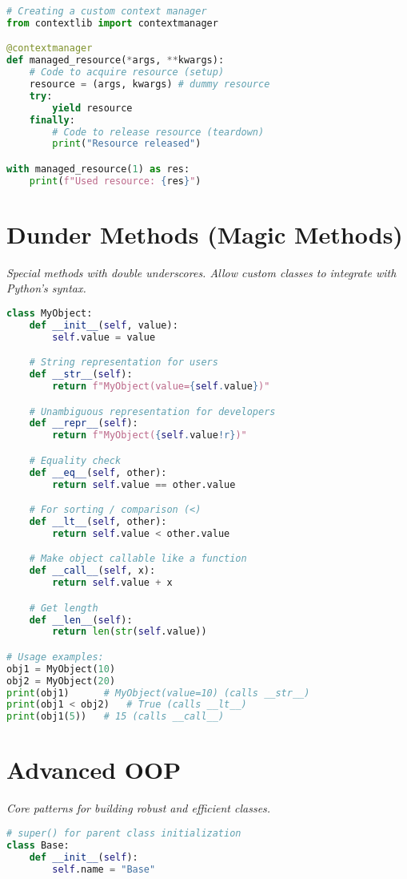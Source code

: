 \documentclass[8pt,landscape]{article}
\begin{document}
\begin{multicols}{3}
\begin{lstlisting}[language=Python]
# Creating a custom context manager
from contextlib import contextmanager

@contextmanager
def managed_resource(*args, **kwargs):
    # Code to acquire resource (setup)
    resource = (args, kwargs) # dummy resource
    try:
        yield resource
    finally:
        # Code to release resource (teardown)
        print("Resource released")

with managed_resource(1) as res:
    print(f"Used resource: {res}")
\end{lstlisting}

\section*{Dunder Methods (Magic Methods)}
\textit{Special methods with double underscores. Allow custom classes to integrate with Python's syntax.}
\begin{lstlisting}[language=Python]
class MyObject:
    def __init__(self, value):
        self.value = value

    # String representation for users
    def __str__(self):
        return f"MyObject(value={self.value})"

    # Unambiguous representation for developers
    def __repr__(self):
        return f"MyObject({self.value!r})"

    # Equality check
    def __eq__(self, other):
        return self.value == other.value

    # For sorting / comparison (<)
    def __lt__(self, other):
        return self.value < other.value

    # Make object callable like a function
    def __call__(self, x):
        return self.value + x

    # Get length
    def __len__(self):
        return len(str(self.value))

# Usage examples:
obj1 = MyObject(10)
obj2 = MyObject(20)
print(obj1)      # MyObject(value=10) (calls __str__)
print(obj1 < obj2)   # True (calls __lt__)
print(obj1(5))   # 15 (calls __call__)
\end{lstlisting}

\section*{Advanced OOP}
\textit{Core patterns for building robust and efficient classes.}
\begin{lstlisting}[language=Python]
# super() for parent class initialization
class Base:
    def __init__(self):
        self.name = "Base"


\end{lstlisting}
\end{multicols}
\end{document}
